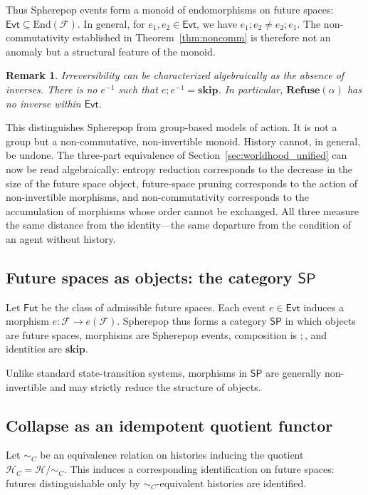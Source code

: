 \documentclass[11pt]{article}
\newtheorem{remark}{Remark}
\newcommand{\Future}{\mathcal{F}}
\begin{document}
Thus Spherepop events form a monoid of endomorphisms on future spaces:
$\mathsf{Evt} \subseteq \mathrm{End}(\Future)$. In general, for
$e_1, e_2 \in \mathsf{Evt}$, we have $e_1 ; e_2 \neq e_2 ; e_1$. The
non-commutativity established in Theorem~\ref{thm:noncomm} is therefore not an
anomaly but a structural feature of the monoid.

\begin{remark}
Irreversibility can be characterized algebraically as the absence of inverses.
There is no $e^{-1}$ such that $e ; e^{-1} = \mathbf{skip}$. In particular,
$\mathbf{Refuse}(\alpha)$ has no inverse within $\mathsf{Evt}$.
\end{remark}

This distinguishes Spherepop from group-based models of action. It is not a
group but a non-commutative, non-invertible monoid. History cannot, in general,
be undone. The three-part equivalence of Section~\ref{sec:worldhood_unified}
can now be read algebraically: entropy reduction corresponds to the decrease in
the size of the future space object, future-space pruning corresponds to the
action of non-invertible morphisms, and non-commutativity corresponds to the
accumulation of morphisms whose order cannot be exchanged. All three measure the
same distance from the identity---the same departure from the condition of an
agent without history.

\subsection{Future spaces as objects: the category $\mathsf{SP}$}

Let $\mathsf{Fut}$ be the class of admissible future spaces. Each event
$e \in \mathsf{Evt}$ induces a morphism $e : \Future \to e(\Future)$.
Spherepop thus forms a category $\mathsf{SP}$ in which objects are future
spaces, morphisms are Spherepop events, composition is $;$, and identities are
$\mathbf{skip}$.

Unlike standard state-transition systems, morphisms in $\mathsf{SP}$ are
generally non-invertible and may strictly reduce the structure of objects.

\subsection{Collapse as an idempotent quotient functor}

Let $\sim_C$ be an equivalence relation on histories inducing the quotient
$\mathcal{H}_C = \mathcal{H} / \sim_C$. This induces a corresponding
identification on future spaces: futures distinguishable only by
$\sim_C$-equivalent histories are identified.
\end{document}

